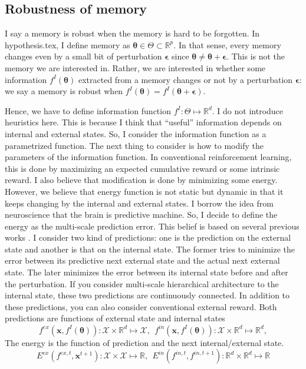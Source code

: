 \documentclass[12pt]{article}
\begin{document}
\subsection{Robustness of memory}
I say a memory is robust when the memory is hard to be forgotten. In hypothesis.tex, I define memory as 
$\bm{\theta} \in \Theta \subset \mathbb{R}^p$. In that sense, every memory changes even by a small bit of 
perturbation $\bm{\epsilon}$ since $\bm{\theta} \neq \bm{\theta} + \bm{\epsilon}$. This is not the memory 
we are interested in. Rather, we are interested in whether some information $f^I(\bm{\theta})$ extracted from a memory changes or not 
by a perturbation $\bm{\epsilon}$: we say a memory is robust when $f^I(\bm{\theta}) = f^I(\bm{\theta}+ \bm{\epsilon})$.

Hence, we have to define information function $f^I: \Theta \mapsto \mathbb{R}^d$. I do not introduce heuristics here. 
This is because I think that ``useful'' information depends on internal and external states. So, I consider 
the information function as a parametrized function. The next thing to consider is how to modify the parameters of 
the information function. In conventional reinforcement learning, this is done by maximizing an expected cumulative reward or 
some intrinsic reward. I also believe that modification is done by minimizing some energy. However, we believe that 
energy function is not static but dynamic in that it keeps changing by the internal and external states. 
I borrow the idea from neuroscience that the brain is predictive machine. So, I decide to define the energy as the 
 multi-scale prediction error. This belief is based on several previous works \cite{Schmidhuber10,Friston10,Hawkings04}. 
 I consider two kind of predictions: one is the prediction on the external state and another is that on the internal state. 
 The former tries to minimize the error between its predictive next external state and the actual next external state. 
 The later minimizes the error between its internal state before and after the perturbation. If you consider multi-scale hierarchical 
 architecture to the internal state, these two predictions are continuously connected. In addition to these predictions, you can also consider 
 conventional external reward. Both predictions are functions of external state and internal states
 \begin{equation}
     f^{ex}(\bm{x}, f^I(\bm{\theta})): \mathcal{X} \times \mathbb{R}^d \mapsto \mathcal{X}, \ \ f^{in}(\bm{x}, f^I(\bm{\theta})): \mathcal{X} \times \mathbb{R}^d \mapsto \mathbb{R}^d,
 \end{equation}
 The energy is the function of prediction and the next internal/external state.
 \begin{equation}
     E^{ex}(f^{ex, t}, \bm{x}^{t + 1}): \mathcal{X} \times \mathcal{X} \mapsto \mathbb{R}, \ \ E^{in}(f^{in, t}, f^{in, t + 1}): \mathbb{R}^d \times \mathbb{R}^d \mapsto \mathbb{R}
 \end{equation}
\end{document}
